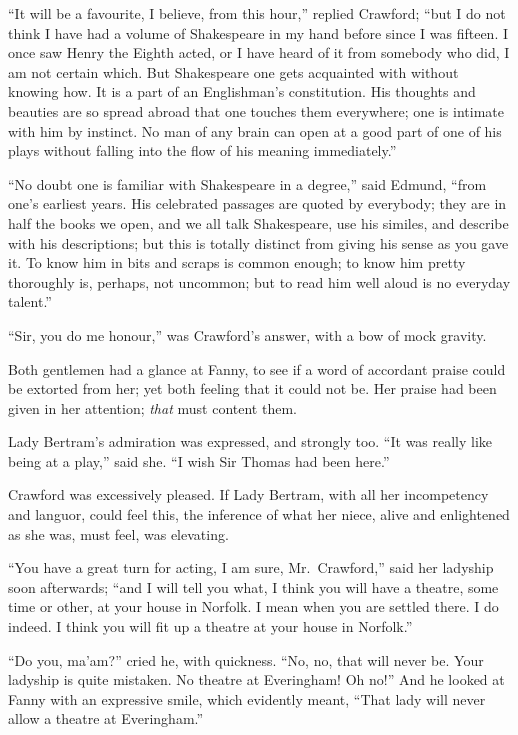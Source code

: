 ``It will be a favourite, I believe, from this hour,''
replied Crawford; ``but I do not think I have had a volume
of Shakespeare in my hand before since I was fifteen.
I once saw Henry the Eighth acted, or I have heard
of it from somebody who did, I am not certain which.
But Shakespeare one gets acquainted with without knowing how.
It is a part of an Englishman's constitution.  His thoughts
and beauties are so spread abroad that one touches
them everywhere; one is intimate with him by instinct.
No man of any brain can open at a good part of one
of his plays without falling into the flow of his
meaning immediately.''

``No doubt one is familiar with Shakespeare in a degree,''
said Edmund, ``from one's earliest years.  His celebrated
passages are quoted by everybody; they are in half
the books we open, and we all talk Shakespeare,
use his similes, and describe with his descriptions;
but this is totally distinct from giving his sense as you
gave it.  To know him in bits and scraps is common enough;
to know him pretty thoroughly is, perhaps, not uncommon;
but to read him well aloud is no everyday talent.''

``Sir, you do me honour,'' was Crawford's answer, with a bow
of mock gravity.

Both gentlemen had a glance at Fanny, to see if a word
of accordant praise could be extorted from her; yet both
feeling that it could not be.  Her praise had been given
in her attention; \emph{that} must content them.

Lady Bertram's admiration was expressed, and strongly too.
``It was really like being at a play,'' said she.  ``I wish
Sir Thomas had been here.''

Crawford was excessively pleased.  If Lady Bertram,
with all her incompetency and languor, could feel this,
the inference of what her niece, alive and enlightened
as she was, must feel, was elevating.

``You have a great turn for acting, I am sure, Mr.\ Crawford,''
said her ladyship soon afterwards; ``and I will tell you what,
I think you will have a theatre, some time or other,
at your house in Norfolk.  I mean when you are settled there.
I do indeed.  I think you will fit up a theatre at your
house in Norfolk.''

``Do you, ma'am?'' cried he, with quickness.  ``No, no,
that will never be.  Your ladyship is quite mistaken.
No theatre at Everingham!  Oh no!''  And he looked at Fanny
with an expressive smile, which evidently meant, ``That lady
will never allow a theatre at Everingham.''

